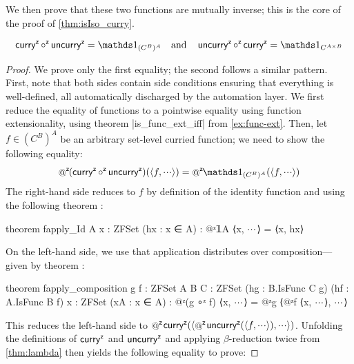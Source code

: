 We then prove that these two functions are mutually inverse; this is the core of the proof of \cref{thm:isIso_curry}.
\begin{lemma}
  \label{lem:curry-uncurry-inverse}
  \begin{equation*}
    \zunop{\mathsf{curry}} \zbinop{\circ} \zunop{\mathsf{uncurry}} = \Id{(C^B)^A} \quad \text{and} \quad
    \zunop{\mathsf{uncurry}} \zbinop{\circ} \zunop{\mathsf{curry}} = \Id{C^{A \times B}}
  \end{equation*}
\end{lemma}
\begin{proof}
  We prove only the first equality; the second follows a similar pattern.
  First, note that both sides contain side conditions ensuring that everything is well-defined, all automatically discharged by the automation layer.
  We first reduce the equality of functions to a pointwise equality using function extensionality, using theorem \inlinelean|is_func_ext_iff| from \cref{ex:func-ext}.
  Then, let $f \in (C^B)^A$ be an arbitrary set-level curried function; we need to show the following equality:
  \begin{equation*}
    \fapply{(\zunop{\mathsf{curry}} \zbinop{\circ} \zunop{\mathsf{uncurry}})}{\langle f, \irrelprf \rangle} =
    \fapply{\Id{(C^B)^A}}{\langle f, \irrelprf \rangle}
  \end{equation*}
  The right-hand side reduces to $f$ by definition of the identity function and using the following theorem {\small{}}:
  \begin{leanlisting}
theorem fapply_Id {A x : ZFSet} (hx : x ∈ A) : @ᶻ𝟙A ⟨x, $\irrelprf$⟩ = ⟨x, hx⟩
\end{leanlisting}
  On the left-hand side, we use that application distributes over composition---given by theorem {\small{}}:
  \begin{leanlisting}
theorem fapply_composition {g f : ZFSet} {A B C : ZFSet}
  (hg : B.IsFunc C g) (hf : A.IsFunc B f) {x : ZFSet} (xA : x ∈ A) :
  @ᶻ(g ∘ᶻ f) ⟨x, $\irrelprf$⟩ = @ᶻg ⟨@ᶻf ⟨x, $\irrelprf$⟩, $\irrelprf$⟩
\end{leanlisting}
  This reduces the left-hand side to
  $\fapply{\zunop{\mathsf{curry}}}{\langle \fapply{\zunop{\mathsf{uncurry}}}{\langle f, \irrelprf \rangle}, \irrelprf \rangle}$.
  Unfolding the definitions of $\mathop{\mathsf{\mathsf{curry}}^{\mathsf{z}}}$ and $\mathop{\mathsf{\mathsf{uncurry}}^{\mathsf{z}}}$ and applying $\beta$-reduction twice from \cref{thm:lambda} then yields the following equality to prove:

\end{proof}
